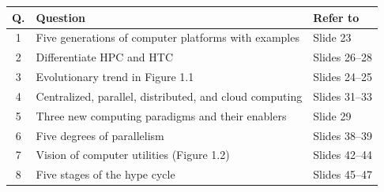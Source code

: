 \documentclass[11pt,a4paper]{article}
\begin{document}
\begin{center}
\renewcommand{\arraystretch}{1.2}
\small
\begin{tabularx}{\linewidth}{@{}cXl@{}}
\toprule
\textbf{Q.} & \textbf{Question} & \textbf{Refer to} \\ \midrule
1 & Five generations of computer platforms with examples & Slide 23 \\
2 & Differentiate HPC and HTC & Slides 26--28 \\
3 & Evolutionary trend in Figure 1.1 & Slides 24--25 \\
4 & Centralized, parallel, distributed, and cloud computing & Slides 31--33 \\
5 & Three new computing paradigms and their enablers & Slide 29 \\
6 & Five degrees of parallelism & Slides 38--39 \\
7 & Vision of computer utilities (Figure 1.2) & Slides 42--44 \\
8 & Five stages of the hype cycle & Slides 45--47 \\ \bottomrule
\end{tabularx}
\end{center}
\end{document}
